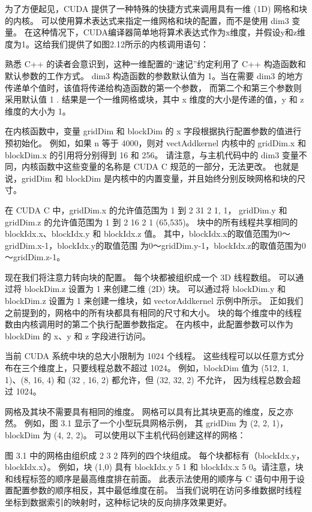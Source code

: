 为了方便起见，CUDA 提供了一种特殊的快捷方式来调用具有一维 (1D) 网格和块的内核。 
可以使用算术表达式来指定一维网格和块的配置，而不是使用 dim3 变量。 
在这种情况下，CUDA编译器简单地将算术表达式作为x维度，并假设y和z维度为1。这给我们提供了如图2.12所示的内核调用语句：

熟悉 C++ 的读者会意识到，这种一维配置的“速记”约定利用了 C++ 构造函数和默认参数的工作方式。 
dim3 构造函数的参数默认值为 1。当在需要 dim3 的地方传递单个值时，该值将传递给构造函数的第一个参数，
而第二个和第三个参数则采用默认值 1 . 结果是一个一维网格或块，其中 x 维度的大小是传递的值，y 和 z 维度的大小为 1。

在内核函数中，变量 gridDim 和 blockDim 的 x 字段根据执行配置参数的值进行预初始化。 
例如，如果 n 等于 4000，则对 vectAddkernel 内核中的 gridDim.x 和 blockDim.x 的引用将分别得到 16 和 256。 
请注意，与主机代码中的 dim3 变量不同，内核函数中这些变量的名称是 CUDA C 规范的一部分，无法更改。 
也就是说，gridDim 和 blockDim 是内核中的内置变量，并且始终分别反映网格和块的尺寸。

在 CUDA C 中，gridDim.x 的允许值范围为 1 到 2 31 2 1, 1，
gridDim.y 和 gridDim.z 的允许值范围为 1 到 2 16 2 1 (65,535)。 
块中的所有线程共享相同的 blockIdx.x、blockIdx.y 和 blockIdx.z 值。 
其中，blockIdx.x的取值范围为0～gridDim.x-1，blockIdx.y的取值范围
为0～gridDim.y-1，blockIdx.z的取值范围为0～gridDim.z-1。

现在我们将注意力转向块的配置。 每个块都被组织成一个 3D 线程数组。 可以通过将 blockDim.z 设置为 1 来创建二维 (2D) 块。
可以通过将 blockDim.y 和 blockDim.z 设置为 1 来创建一维块，如 vectorAddkernel 示例中所示。 
正如我们之前提到的，网格中的所有块都具有相同的尺寸和大小。 块的每个维度中的线程数由内核调用时的第二个执行配置参数指定。 
在内核中，此配置参数可以作为 blockDim 的 x、y 和 z 字段进行访问。

当前 CUDA 系统中块的总大小限制为 1024 个线程。 这些线程可以以任意方式分布在三个维度上，只要线程总数不超过 1024。
例如，blockDim 值为 (512, 1, 1)、(8, 16, 4) 和 (32 , 16, 2) 都允许，但 (32, 32, 2) 不允许，
因为线程总数会超过 1024。

网格及其块不需要具有相同的维度。 网格可以具有比其块更高的维度，反之亦然。 例如，图 3.1 显示了一个小型玩具网格示例，
其 gridDim 为 (2, 2, 1)，blockDim 为 (4, 2, 2)。 可以使用以下主机代码创建这样的网格：

图 3.1 中的网格由组织成 2 3 2 阵列的四个块组成。 每个块都标有（blockIdx.y，blockIdx.x）。 
例如，块 (1,0) 具有 blockIdx.y 5 1 和 blockIdx.x 5 0。请注意，块和线程标签的顺序是最高维度排在前面。 
此表示法使用的顺序与 C 语句中用于设置配置参数的顺序相反，其中最低维度在前。 
当我们说明在访问多维数据时线程坐标到数据索引的映射时，这种标记块的反向排序效果更好。

